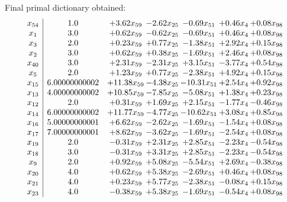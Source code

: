 \documentclass[8pt]{article}
\begin{document}
 Final primal dictionary obtained: 
\[\begin{array}{c| c c@{\hskip 2pt} c@{\hskip 2pt} c@{\hskip 2pt} c@{\hskip 2pt} c@{\hskip 2pt} }
 x_{54}   &  1.0 & +  3.62 x_{59} & -2.62 x_{25} & -0.69 x_{51} & +  0.46 x_{4} & +  0.08 x_{98}\\
 x_{1}   &  3.0 & +  0.62 x_{59} & -0.62 x_{25} & -0.69 x_{51} & +  0.46 x_{4} & +  0.08 x_{98}\\
 x_{3}   &  2.0 & +  0.23 x_{59} & +  0.77 x_{25} & -1.38 x_{51} & +  2.92 x_{4} & +  0.15 x_{98}\\
 x_{2}   &  3.0 & +  0.62 x_{59} & +  0.38 x_{25} & -1.69 x_{51} & +  2.46 x_{4} & +  0.08 x_{98}\\
 x_{40}   &  3.0 & +  2.31 x_{59} & -2.31 x_{25} & +  3.15 x_{51} & -3.77 x_{4} & +  0.54 x_{98}\\
 x_{5}   &  2.0 & +  1.23 x_{59} & +  0.77 x_{25} & -2.38 x_{51} & +  4.92 x_{4} & +  0.15 x_{98}\\
 x_{15}   &  6.00000000002 & + 11.38 x_{59} & -4.38 x_{25} & -10.31 x_{51} & +  2.54 x_{4} & +  0.92 x_{98}\\
 x_{13}   &  4.00000000002 & + 10.85 x_{59} & -7.85 x_{25} & -5.08 x_{51} & +  1.38 x_{4} & +  0.23 x_{98}\\
 x_{12}   &  2.0 & +  0.31 x_{59} & +  1.69 x_{25} & +  2.15 x_{51} & -1.77 x_{4} & -0.46 x_{98}\\
 x_{14}   &  6.00000000002 & + 11.77 x_{59} & -4.77 x_{25} & -10.62 x_{51} & +  3.08 x_{4} & +  0.85 x_{98}\\
 x_{16}   &  5.00000000001 & +  6.62 x_{59} & -2.62 x_{25} & -1.69 x_{51} & -1.54 x_{4} & +  0.08 x_{98}\\
 x_{17}   &  7.00000000001 & +  8.62 x_{59} & -3.62 x_{25} & -1.69 x_{51} & -2.54 x_{4} & +  0.08 x_{98}\\
 x_{19}   &  2.0 & -0.31 x_{59} & +  2.31 x_{25} & +  2.85 x_{51} & -2.23 x_{4} & -0.54 x_{98}\\
 x_{18}   &  3.0 & -0.31 x_{59} & +  3.31 x_{25} & +  2.85 x_{51} & -2.23 x_{4} & -0.54 x_{98}\\
 x_{9}   &  2.0 & +  0.92 x_{59} & +  5.08 x_{25} & -5.54 x_{51} & +  2.69 x_{4} & -0.38 x_{98}\\
 x_{20}   &  4.0 & +  0.62 x_{59} & +  5.38 x_{25} & -2.69 x_{51} & +  0.46 x_{4} & +  0.08 x_{98}\\
 x_{21}   &  4.0 & +  0.23 x_{59} & +  5.77 x_{25} & -2.38 x_{51} & -0.08 x_{4} & +  0.15 x_{98}\\
 x_{23}   &  4.0 & -0.38 x_{59} & +  5.38 x_{25} & -1.69 x_{51} & -0.54 x_{4} & +  0.08 x_{98}\\

\end{array}\]
\end{document}
